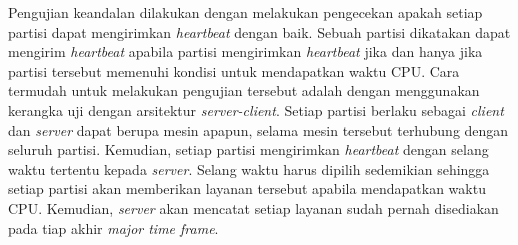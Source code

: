 Pengujian keandalan dilakukan dengan melakukan pengecekan apakah setiap partisi dapat
mengirimkan \textit{heartbeat} dengan baik. Sebuah partisi dikatakan dapat mengirim
\textit{heartbeat} apabila partisi mengirimkan \textit{heartbeat} jika dan hanya jika partisi
tersebut memenuhi kondisi untuk mendapatkan waktu CPU. Cara termudah untuk melakukan pengujian
tersebut adalah dengan menggunakan kerangka uji dengan arsitektur \textit{server-client}. Setiap
partisi berlaku sebagai \textit{client} dan \textit{server} dapat berupa mesin apapun, selama
mesin tersebut terhubung dengan seluruh partisi. Kemudian, setiap partisi mengirimkan
\textit{heartbeat} dengan selang waktu tertentu kepada \textit{server}. Selang waktu harus
dipilih sedemikian sehingga setiap partisi akan memberikan layanan tersebut apabila mendapatkan
waktu CPU. Kemudian, \textit{server} akan mencatat setiap layanan sudah pernah disediakan pada
tiap akhir \textit{major time frame}.

